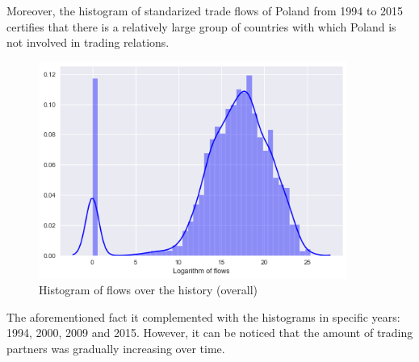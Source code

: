 \documentclass{Trade_template}
\numberwithin{equation}{section}
\begin{document}
Moreover, the histogram of standarized trade flows of Poland from 1994 to 2015 certifies that there is a relatively large group of countries with which Poland is not involved in trading relations. 

\begin{figure}[H]
\centering
\includegraphics[width=0.9\textwidth]{Histogram_of_flows_over_the_history}
\caption[Histogram of flows over the history]{Histogram of flows over the history (overall)}
\end{figure} 

\newpage

The aforementioned fact it complemented with the histograms in specific years: 1994, 2000, 2009 and 2015. However, it can be noticed that the amount of trading partners was gradually increasing over time.
\end{document}
